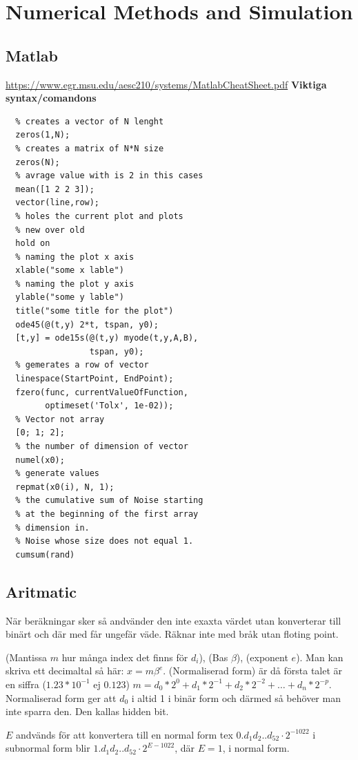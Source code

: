 \chapter{Numerical Methods and Simulation}

\newpage

\begin{multicols}{2}
\section{Matlab}
\url{https://www.egr.msu.edu/aesc210/systems/MatlabCheatSheet.pdf} \newline
\textbf{Viktiga syntax/comandons}
\begin{verbatim}
  % creates a vector of N lenght
  zeros(1,N);  
  % creates a matrix of N*N size
  zeros(N); 
  % avrage value with is 2 in this cases
  mean([1 2 2 3]); 
  vector(line,row); 
  % holes the current plot and plots 
  % new over old
  hold on 
  % naming the plot x axis
  xlable("some x lable") 
  % naming the plot y axis
  ylable("some y lable") 
  title("some title for the plot")
  ode45(@(t,y) 2*t, tspan, y0);
  [t,y] = ode15s(@(t,y) myode(t,y,A,B), 
                 tspan, y0);
  % gemerates a row of vector
  linespace(StartPoint, EndPoint); 
  fzero(func, currentValueOfFunction, 
        optimeset('Tolx', 1e-02)); 
  % Vector not array
  [0; 1; 2]; 
  % the number of dimension of vector
  numel(x0); 
  % generate values 
  repmat(x0(i), N, 1); 
  % the cumulative sum of Noise starting
  % at the beginning of the first array
  % dimension in.
  % Noise whose size does not equal 1.
  cumsum(rand) 
\end{verbatim}


\section{Aritmatic}
När beräkningar sker så andvänder den inte exaxta värdet utan konverterar till binärt och där med får
ungefär väde. Räknar inte med bråk utan floting point.

(Mantissa $m$ hur många index det finns för $d_i$), (Bas $\beta$), (exponent $e$). Man kan skriva ett decimaltal så här: $x=m\beta^e$.
(Normaliserad form) är då första talet är en siffra ($1.23*10^{-1}$ ej $0.123$)
$m=d_0*2^0+d_1*2^{-1}+d_2*2^{-2}+ \ldots +d_n*2^{-p}$. Normaliserad form ger att $d_0$ i altid 1 i binär form och
därmed så behöver man inte sparra den. Den kallas hidden bit.

$E$ andvänds för att konvertera till en normal form tex $0.d_1d_2..d_{52}\cdot{2^{-1022}}$ i subnormal form blir
$1.d_1d_2..d_{52}\cdot{2^{E-1022}}$, där $E=1$, i normal form.


\end{multicols}
